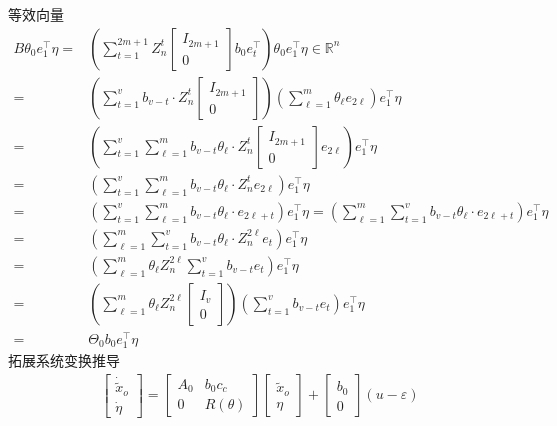 \documentclass[a4paper,12pt]{article}
\begin{document}
等效向量
\begin{align*}
    B\theta_0e_1^\top \eta 
    = & \left(\sum_{t=1}^{2m+1} Z_n^{t} \begin{bmatrix}I_{2m+1}\\ 0\end{bmatrix} b_0 e_{t}^\top \right)
    \theta_0 e_1^\top \eta \in \mathbb{R}^{n} 
    \\ = & 
    \left(\sum_{t=1}^{v} b_{v-t}\cdot Z_n^{t} \begin{bmatrix}I_{2m+1}\\ 0\end{bmatrix} \right)
    \left(\sum_{\ell=1}^{m} \theta_\ell e_{2\ell} \right)e_1^\top \eta
    \\ = & 
    \left(\sum_{t=1}^{v} \sum_{\ell=1}^{m} 
    b_{v-t}\theta_\ell\cdot Z_n^{t} \begin{bmatrix}I_{2m+1}\\ 0\end{bmatrix} e_{2\ell} \right) e_1^\top \eta
    \\ = & 
    \left(\sum_{t=1}^{v} \sum_{\ell=1}^{m} 
    b_{v-t}\theta_\ell\cdot Z_n^{t} e_{2\ell} \right) e_1^\top \eta
    \\ = & 
    \left(\sum_{t=1}^{v} \sum_{\ell=1}^{m} 
    b_{v-t}\theta_\ell\cdot e_{2\ell+t} \right) e_1^\top \eta
    =  \left( \sum_{\ell=1}^{m} \sum_{t=1}^{v}
    b_{v-t}\theta_\ell\cdot e_{2\ell+t} \right) e_1^\top \eta
    \\ = & 
    \left( \sum_{\ell=1}^{m} \sum_{t=1}^{v}
    b_{v-t}\theta_\ell\cdot Z_n^{2\ell} e_{t} \right) e_1^\top \eta
    \\ = & 
    \left( \sum_{\ell=1}^{m} 
    \theta_\ell Z_n^{2\ell} \sum_{t=1}^{v} b_{v-t} e_{t} \right) e_1^\top \eta
    \\ = & 
    \left( \sum_{\ell=1}^{m} \theta_\ell Z_n^{2\ell} \begin{bmatrix}I_{v}\\ 0\end{bmatrix}\right)
    \left(\sum_{t=1}^{v} b_{v-t} e_{t} \right) e_1^\top \eta
    \\ = & \Theta_0b_0 e_1^\top \eta 
\end{align*}
拓展系统变换推导
\begin{align*}
    \begin{bmatrix}
        \dot{\tilde{x}}_o \\ \dot{\eta} 
    \end{bmatrix}
    =    \begin{bmatrix}
        A_0 & b_0c_c \\
        0 & R(\theta)
    \end{bmatrix}
    \begin{bmatrix}
        \tilde{x}_o \\ \eta 
    \end{bmatrix} + 
    \begin{bmatrix}
        b_0 \\ 0
    \end{bmatrix} (u-\varepsilon)
\end{align*}
\end{document}
